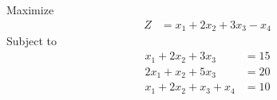 \documentclass[12pt]{article}
\begin{document}
\subsection{}
Maximize
\begin{align*}
Z                        & = x_{1}+2x_{2}+3x_{3}-x_{4}
\end{align*}
Subject to
\begin{align*}
x_{1}+2x_{2}+3x_{3}      & = 15                                                                                                                                                                                                                                                             \\
2x_{1}+x_{2}+5x_{3}      & = 20                                                                                                                                                                                                                                                             \\
x_{1}+2x_{2}+x_{3}+x_{4} & = 10                                                                                                                                                                                                                                                             \\
\end{align*}
\end{document}
